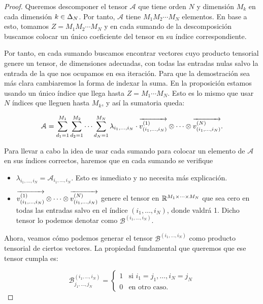 \begin{proof}
	Queremos descomponer el tensor $\mathcal{A}$ que tiene orden $N$ y dimensión $M_k$ en cada dimensión $k \in \Delta_{N}$. Por tanto, $\mathcal{A}$ tiene $M_1 M_2 \cdots M_N$ elementos. En base a esto, tomamos $Z = M_1 M_2 \cdots M_N$ y en cada sumando de la descomposición buscamos colocar un único coeficiente del tensor en su índice correspondiente.

	Por tanto, en cada sumando buscamos encontrar vectores cuyo producto tensorial genere un tensor, de dimensiones adecuadas, con todas las entradas nulas salvo la entrada de la que nos ocupamos en esa iteración. Para que la demostración sea más clara cambiaremos la forma de indexar la suma. En la proposición estamos usando un único índice que llega hasta $Z = M_1 \cdots M_N$. Esto es lo mismo que usar $N$ índices que lleguen hasta $M_k$, y así la sumatoria queda:

	\begin{equation}
		\mathcal{A} = \sum_{d_1 = 1}^{M_1} \sum_{d_2 = 1}^{M_2} \cdots \sum_{d_N = 1}^{M_N} \lambda_{i_1, \ldots, i_N} \cdot \overrightarrow{v_{(i_1, \ldots, i_N)}^{(1)}} \otimes \cdots \otimes \overrightarrow{v_{(i_1, \ldots, i_N)}^{(N)}}.
	\end{equation}

	Para llevar a cabo la idea de usar cada sumando para colocar un elemento de $\mathcal{A}$ en sus índices correctos, haremos que en cada sumando se verifique

	\begin{itemize}
		\item $\lambda_{i_1, \ldots, i_N} = \mathcal{A}_{i_1, \ldots, i_N}$. Esto es inmediato y no necesita más explicación.
		\item $\overrightarrow{v_{(i_1, \ldots, i_N)}^{(1)}} \otimes \cdots \otimes \overrightarrow{v_{(i_1, \ldots, i_N)}^{(N)}}$ genere el tensor en $\mathbb{R}^{M_1 \times \cdots \times M_N}$ que sea cero en todas las entradas salvo en el índice $(i_1, \ldots, i_N)$, donde valdrá 1. Dicho tensor lo podemos denotar como  $\mathcal{B}^{(i_1, \ldots, i_N)}$.
	\end{itemize}

	Ahora, veamos cómo podemos generar el tensor $\mathcal{B}^{(i_1, \ldots, i_N)}$ como producto tensorial de ciertos vectores. La propiedad fundamental que queremos que ese tensor cumpla es:

	\begin{equation}
		\mathcal{B}^{(i_1, \ldots, i_N)}_{j_1, \ldots, j_N} =
		\begin{cases}
			1 & \text{si } i_1 = j_1, \ldots, i_N = j_N \\
			0 & \text{en otro caso}.
		\end{cases}
	\end{equation}


\end{proof}
